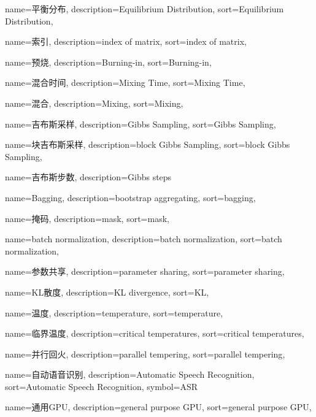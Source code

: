 {
  name=平衡分布,
  description={Equilibrium Distribution},
  sort={Equilibrium Distribution},
}

{
  name=索引,
  description={index of matrix},
  sort={index of matrix},
}

{
  name=预烧,
  description={Burning-in},
  sort={Burning-in},
}

{
  name=混合时间,
  description={Mixing Time},
  sort={Mixing Time},
}

{
  name=混合,
  description={Mixing},
  sort={Mixing},
}

{
  name=吉布斯采样,
  description={Gibbs Sampling},
  sort={Gibbs Sampling},
}

{
  name=块吉布斯采样,
  description={block Gibbs Sampling},
  sort={block Gibbs Sampling},
}

{
  name=吉布斯步数,
  description={Gibbs steps}
}

{
  name=Bagging,
  description={bootstrap aggregating},
  sort={bagging},
}

{
  name=掩码,
  description={mask},
  sort={mask},
}

{
  name=batch normalization,
  description={batch normalization},
  sort={batch normalization},
}

{
  name=参数共享,
  description={parameter sharing},
  sort={parameter sharing},
}

{
  name=KL散度,
  description={KL divergence},
  sort={KL},
}

{
  name=温度,
  description={temperature},
  sort={temperature},
}

{
  name=临界温度,
  description={critical temperatures},
  sort={critical temperatures},
}

{
  name=并行回火,
  description={parallel tempering},
  sort={parallel tempering},
}

{
  name=自动语音识别,
  description={Automatic Speech Recognition},
  sort={Automatic Speech Recognition},
  symbol={ASR}
}

{
  name=通用GPU,
  description={general purpose GPU},
  sort={general purpose GPU},
}

